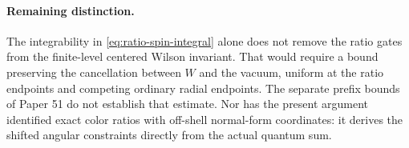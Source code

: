 \paragraph{Remaining distinction.}
The integrability in \eqref{eq:ratio-spin-integral} alone does not
remove the ratio gates from the finite-level centered Wilson invariant.
That would require a bound preserving the cancellation between $W$
and the vacuum, uniform at the ratio endpoints and competing ordinary
radial endpoints. The separate prefix bounds of Paper 51 do not
establish that estimate. Nor has the present argument identified exact
color ratios with off-shell normal-form coordinates: it derives the
shifted angular constraints directly from the actual quantum sum.
